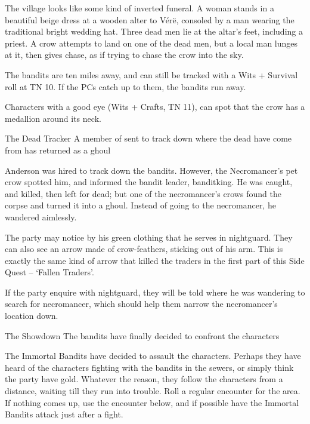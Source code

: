 \begin{multicols}{2}
\begin{boxtext}

	The village looks like some kind of inverted funeral.
	A woman stands in a beautiful beige dress at a wooden alter to V\'{e}r\"{e}, consoled by a man wearing the traditional bright wedding hat.
	Three dead men lie at the altar's feet, including a priest.
	A crow attempts to land on one of the dead men, but a local man lunges at it, then gives chase, as if trying to chase the crow into the sky.

\end{boxtext}

The bandits are ten miles away, and can still be tracked with a Wits + Survival roll at TN 10.
If the PCs catch up to them, the bandits run away.

Characters with a good eye (Wits + Crafts, TN 11), can spot that the crow has a medallion around its neck.

{The Dead Tracker}%
{A member of  sent to track down where the dead have come from has returned as a ghoul}%

Anderson was hired to track down the bandits.
However, the Necromancer's pet crow spotted him, and informed the bandit leader, \gls{banditking}.
He was caught, and killed, then left for dead; but one of the necromancer's crows found the corpse and turned it into a ghoul.
Instead of going to the necromancer, he wandered aimlessly.

The party may notice by his green clothing that he serves in \gls{nightguard}.
They can also see an arrow made of crow-feathers, sticking out of his arm.
This is exactly the same kind of arrow that killed the traders in the first part of this Side Quest -- `Fallen Traders'.


If the party enquire with \gls{nightguard}, they will be told where he was wandering to search for \gls{necromancer}, which should help them narrow the necromancer's location down.

{The Showdown}%
{The bandits have finally decided to confront the characters}%

The Immortal Bandits have decided to assault the characters.
Perhaps they have heard of the characters fighting with the bandits in the sewers, or simply think the party have gold.
Whatever the reason, they follow the characters from a distance, waiting till they run into trouble.
Roll a regular encounter for the area.
If nothing comes up, use the encounter below, and if possible have the Immortal Bandits attack just after a fight.


\end{multicols}
